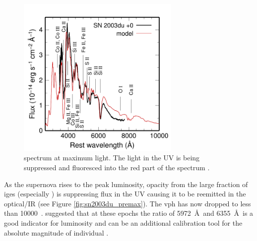\begin{figure}[t!] %
\centering
    \includegraphics[width=0.7\textwidth]{chapter_intro/plots/2003du_p0.pdf}%
   \caption[Maximum light spectrum of SN 2003du]{ spectrum at maximum light. The light in the UV is being suppressed and fluoresced into the red part of the spectrum \citep[Figure kindly provided by M. Tanaka;][]{2011MNRAS.410.1725T}.}
   \label{fig:sn2003du_max}
\end{figure}

As the supernova rises to the peak luminosity, opacity from the large fraction of \glspl{ige} (especially \Ni) is suppressing flux in the UV causing it to be reemitted in the optical/IR  (see Figure \ref{fig:sn2003du_premax}). The \gls{vph} has now dropped to less than 10000~\kms. \citet{1995ApJ...455L.147N} suggested that at these epochs the ratio of  5972~\AA\ and  6355~\AA\ is a good indicator for luminosity and can be an additional calibration tool for the absolute magnitude of individual \sneia.


